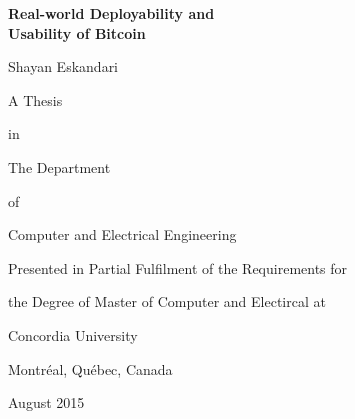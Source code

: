  \begin{titlepage}


     \vspace*{2ex}
     \begin{center}
       {\bf Real-world Deployability and}\\
       {\bf Usability of Bitcoin}
     \end{center}
     \vspace{10ex}
     \begin{center}
	Shayan Eskandari
     \end{center}
     \vspace{11ex}
     \begin{center}
        A Thesis
     \end{center}
     \vspace*{-3ex}
     \begin{center}
        in
     \end{center}
     \vspace*{-3ex}
     \begin{center}
        The Department
     \end{center}
     \vspace*{-3ex}
     \begin{center}
        of
     \end{center}
     \vspace*{-3ex}
     \begin{center}
       Computer and Electrical Engineering 
     \end{center}
     \vspace{14ex}
     \begin{center}
        Presented in Partial Fulfilment of the Requirements for
     \end{center}
     \vspace*{-3ex}
     \begin{center}
        the Degree of Master of Computer and Electircal at
     \end{center}
     \vspace*{-3ex}
     \begin{center}
        Concordia University
     \end{center}
     \vspace*{-3ex}
     \begin{center}
        Montr\'{e}al, Qu\'{e}bec, Canada
     \end{center}
     \vspace{10ex}
     \begin{center}
        August 2015
     \end{center}
  \end{titlepage}

